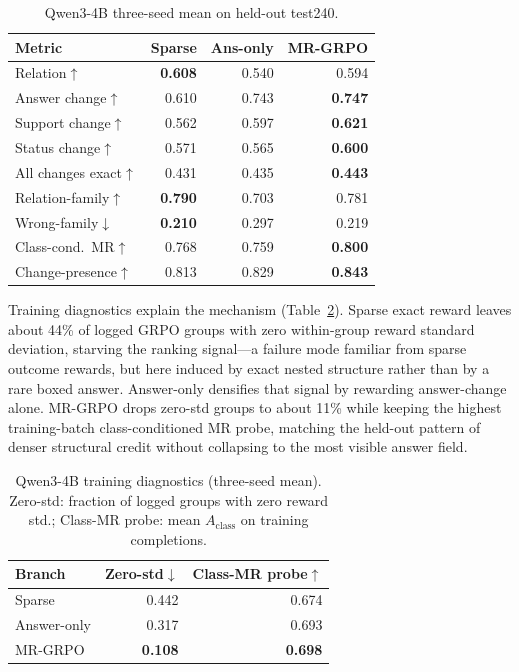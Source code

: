 \documentclass[letterpaper]{article}
\newcommand{\method}{MR-GRPO}
\begin{document}
\begin{table}[t]
\centering
\small
\begin{tabular}{lrrr}
\toprule
Metric & Sparse & Ans-only & \method{} \\
\midrule
Relation$\uparrow$ & \textbf{0.608} & 0.540 & 0.594 \\
Answer change$\uparrow$ & 0.610 & 0.743 & \textbf{0.747} \\
Support change$\uparrow$ & 0.562 & 0.597 & \textbf{0.621} \\
Status change$\uparrow$ & 0.571 & 0.565 & \textbf{0.600} \\
All changes exact$\uparrow$ & 0.431 & 0.435 & \textbf{0.443} \\
Relation-family$\uparrow$ & \textbf{0.790} & 0.703 & 0.781 \\
Wrong-family$\downarrow$ & \textbf{0.210} & 0.297 & 0.219 \\
Class-cond.\ MR$\uparrow$ & 0.768 & 0.759 & \textbf{0.800} \\
Change-presence$\uparrow$ & 0.813 & 0.829 & \textbf{0.843} \\
\bottomrule
\end{tabular}
\caption{Qwen3-4B three-seed mean on held-out test240.}
\label{tab:4b}
\end{table}

Training diagnostics explain the mechanism (Table~\ref{tab:train-diag}). Sparse exact reward leaves about 44\% of logged GRPO groups with zero within-group reward standard deviation, starving the ranking signal---a failure mode familiar from sparse outcome rewards, but here induced by exact nested structure rather than by a rare boxed answer. Answer-only densifies that signal by rewarding answer-change alone. \method{} drops zero-std groups to about 11\% while keeping the highest training-batch class-conditioned MR probe, matching the held-out pattern of denser structural credit without collapsing to the most visible answer field.

\begin{table}[t]
\centering
\small
\begin{tabular}{lrr}
\toprule
Branch & Zero-std$\downarrow$ & Class-MR probe$\uparrow$ \\
\midrule
Sparse & 0.442 & 0.674 \\
Answer-only & 0.317 & 0.693 \\
\method{} & \textbf{0.108} & \textbf{0.698} \\
\bottomrule
\end{tabular}
\caption{Qwen3-4B training diagnostics (three-seed mean). Zero-std: fraction of logged groups with zero reward std.; Class-MR probe: mean $A_{\mathrm{class}}$ on training completions.}
\label{tab:train-diag}
\end{table}
\end{document}
